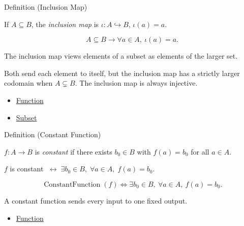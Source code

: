 \begin{definitionbox}{Definition (Inclusion Map)}
\begin{definition}\label{def:inclusion}
If $A \subseteq B$, the \emph{inclusion map} is $\iota : A \hookrightarrow B$,
$\iota(a) = a$.
\end{definition}
\end{definitionbox}

\begin{remark*}
\[
  A\subseteq B\to \forall a\in A,\ \iota(a)=a.
\]
\end{remark*}

\begin{remark*}[Interpretation]
The inclusion map views elements of a subset as elements of the larger set.
\end{remark*}

\begin{remark*}[Exposition]
Both send each element to itself, but the inclusion map has a strictly larger
codomain when $A \subsetneq B$. The inclusion map is always injective.
\end{remark*}

\begin{dependencies}
\begin{itemize}
  \item \hyperref[def:function]{Function}
  \item \hyperref[def:subset]{Subset}
\end{itemize}
\end{dependencies}

\begin{definitionbox}{Definition (Constant Function)}
\begin{definition}\label{def:constant}
$f : A \to B$ is \emph{constant} if there exists $b_0 \in B$ with
$f(a) = b_0$ for all $a \in A$.
\end{definition}
\end{definitionbox}

\begin{remark*}
$f$ is constant $\;\leftrightarrow\; \exists b_0 \in B,\; \forall a \in A,\; f(a) = b_0$.
\end{remark*}

\begin{remark*}
\[
  \operatorname{ConstantFunction}(f)
  \iff
  \exists b_0\in B,\ \forall a\in A,\ f(a)=b_0.
\]
\end{remark*}

\begin{remark*}[Interpretation]
A constant function sends every input to one fixed output.
\end{remark*}

\begin{dependencies}
\begin{itemize}
  \item \hyperref[def:function]{Function}
\end{itemize}
\end{dependencies}
